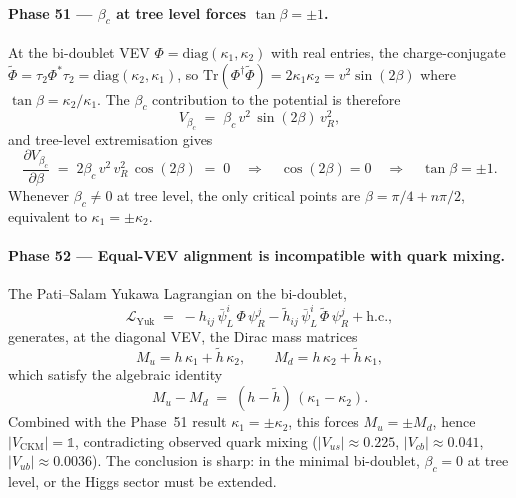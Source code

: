 \documentclass[11pt,a4paper]{article}
\theoremstyle{plain}
\theoremstyle{definition}
\theoremstyle{remark}
\begin{document}
\paragraph{Phase 51 --- $\beta_c$ at tree level forces $\tan\beta = \pm 1$.}
At the bi-doublet VEV $\Phi = \mathrm{diag}(\kappa_1, \kappa_2)$ with
real entries, the charge-conjugate $\tilde{\Phi} = \tau_2 \Phi^* \tau_2
= \mathrm{diag}(\kappa_2, \kappa_1)$, so
$\mathrm{Tr}(\Phi^\dagger \tilde{\Phi}) = 2\kappa_1\kappa_2 = v^2 \sin(2\beta)$
where $\tan\beta = \kappa_2/\kappa_1$.  The $\beta_c$ contribution to the
potential is therefore
\begin{equation}
  V_{\beta_c} \;=\; \beta_c\,v^2\,\sin(2\beta)\,v_R^2,
\end{equation}
and tree-level extremisation gives
\begin{equation}
  \frac{\partial V_{\beta_c}}{\partial\beta}
  \;=\; 2\beta_c\,v^2\,v_R^2\,\cos(2\beta) \;=\; 0
  \quad\Longrightarrow\quad
  \cos(2\beta) = 0
  \quad\Longrightarrow\quad
  \tan\beta = \pm 1.
\end{equation}
Whenever $\beta_c \neq 0$ at tree level, the only critical points are
$\beta = \pi/4 + n\pi/2$, equivalent to $\kappa_1 = \pm\kappa_2$.

\paragraph{Phase 52 --- Equal-VEV alignment is incompatible with quark mixing.}
The Pati--Salam Yukawa Lagrangian on the bi-doublet,
\begin{equation}
  \mathcal{L}_{\mathrm{Yuk}}
  \;=\; -h_{ij}\,\bar{\psi}_L^i\,\Phi\,\psi_R^j
        - \tilde{h}_{ij}\,\bar{\psi}_L^i\,\tilde{\Phi}\,\psi_R^j
        + \mathrm{h.c.},
\end{equation}
generates, at the diagonal VEV, the Dirac mass matrices
\begin{equation}
  M_u = h\,\kappa_1 + \tilde{h}\,\kappa_2,
  \qquad
  M_d = h\,\kappa_2 + \tilde{h}\,\kappa_1,
\end{equation}
which satisfy the algebraic identity
\begin{equation}\label{eq:no-go-identity}
  M_u - M_d \;=\; (h - \tilde{h})\,(\kappa_1 - \kappa_2).
\end{equation}
Combined with the Phase~51 result $\kappa_1 = \pm\kappa_2$, this forces
$M_u = \pm M_d$, hence $|V_{\mathrm{CKM}}| = \mathbb{1}$, contradicting
observed quark mixing
($|V_{us}| \approx 0.225$, $|V_{cb}| \approx 0.041$, $|V_{ub}| \approx 0.0036$).
The conclusion is sharp: in the minimal bi-doublet,
$\beta_c = 0$ at tree level, or the Higgs sector must be extended.
\end{document}
